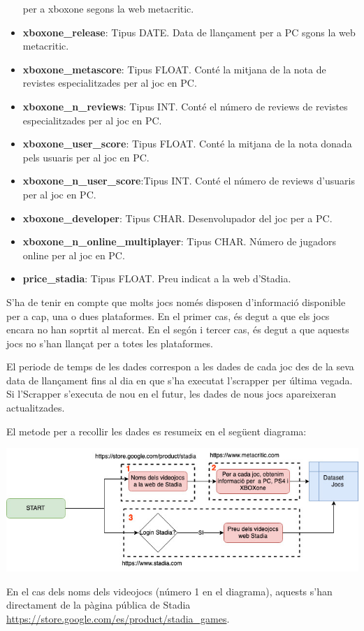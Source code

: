 \documentclass[]{article}
\begin{document}
\begin{itemize}
  per a xboxone segons la web metacritic.
\item
  \textbf{xboxone\_release}: Tipus DATE. Data de llançament per a PC
  sgons la web metacritic.
\item
  \textbf{xboxone\_metascore}: Tipus FLOAT. Conté la mitjana de la nota
  de revistes especialitzades per al joc en PC.
\item
  \textbf{xboxone\_n\_reviews}: Tipus INT. Conté el número de reviews de
  revistes especialitzades per al joc en PC.
\item
  \textbf{xboxone\_user\_score}: Tipus FLOAT. Conté la mitjana de la
  nota donada pels usuaris per al joc en PC.
\item
  \textbf{xboxone\_n\_user\_score}:Tipus INT. Conté el número de reviews
  d'usuaris per al joc en PC.
\item
  \textbf{xboxone\_developer}: Tipus CHAR. Desenvolupador del joc per a
  PC.
\item
  \textbf{xboxone\_n\_online\_multiplayer}: Tipus CHAR. Número de
  jugadors online per al joc en PC.
\item
  \textbf{price\_stadia}: Tipus FLOAT. Preu indicat a la web d'Stadia.
\end{itemize}

S'ha de tenir en compte que molts jocs només disposen d'informació
disponible per a cap, una o dues plataformes. En el primer cas, és degut
a que els jocs encara no han soprtit al mercat. En el segón i tercer
cas, és degut a que aquests jocs no s'han llançat per a totes les
plataformes.

El periode de temps de les dades correspon a les dades de cada joc des
de la seva data de llançament fins al dia en que s'ha executat
l'scrapper per última vegada. Si l'Scrapper s'executa de nou en el
futur, les dades de nous jocs apareixeran actualitzades.

El metode per a recollir les dades es resumeix en el següent diagrama:

\includegraphics{diagrama.jpg}

En el cas dels noms dels videojocs (número 1 en el diagrama), aquests
s'han directament de la pàgina pública de Stadia
\url{https://store.google.com/es/product/stadia_games}.
\end{document}

